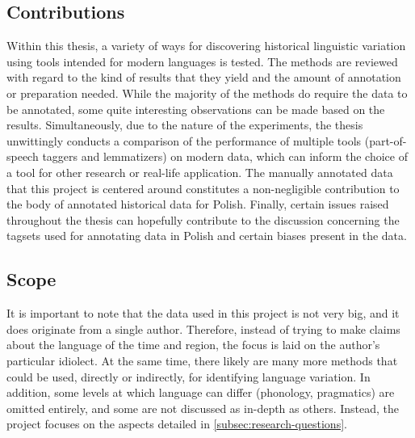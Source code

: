 \subsection{Contributions}
\label{subsec:contributions}

Within this thesis, a variety of ways for discovering historical linguistic variation using tools intended for modern languages is tested. The methods are reviewed with regard to the kind of results that they yield and the amount of annotation or preparation needed. While the majority of the methods do require the data to be annotated, some quite interesting observations can be made based on the results. Simultaneously, due to the nature of the experiments, the thesis unwittingly conducts a comparison of the performance of multiple tools (part-of-speech taggers and lemmatizers) on modern data, which can inform the choice of a tool for other research or real-life application. The manually annotated data that this project is centered around constitutes a non-negligible contribution to the body of annotated historical data for Polish. Finally, certain issues raised throughout the thesis can hopefully contribute to the discussion concerning the tagsets used for annotating data in Polish and certain biases present in the data.

\subsection{Scope}
\label{subsec:scope}

It is important to note that the data used in this project is not very big, and it does originate from a single author. Therefore, instead of trying to make claims about the language of the time and region, the focus is laid on the author's particular idiolect. At the same time, there likely are many more methods that could be used, directly or indirectly, for identifying language variation. In addition, some levels at which language can differ (phonology, pragmatics) are omitted entirely, and some are not discussed as in-depth as others. Instead, the project focuses on the aspects detailed in \autoref{subsec:research-questions}.